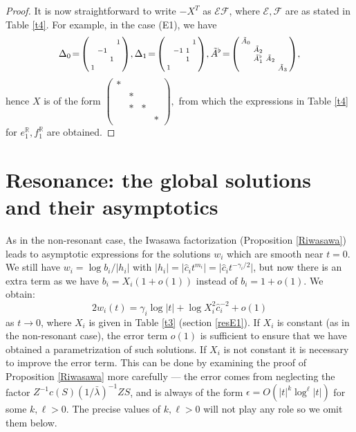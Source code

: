 \documentclass[a4paper,12pt,leqno]{amsart}
\numberwithin{equation}{section}
\theoremstyle{plain}
\theoremstyle{definition}
\newcommand{\R}{\mathbb R}
\newcommand{\ga}{\gamma}
\newcommand{\la}{\lambda}
\newcommand{\eps}{\epsilon}
\newcommand{\De}{\Delta}
\newcommand{\bsp}{\left(\begin{smallmatrix}}
\newcommand{\esp}{\end{smallmatrix}\right)}
\newcommand{\nn}{m}
\begin{document}
{\begin{proof}
It is now straightforward to write $-X^T$ as $\mathcal E \mathcal F$, where $\mathcal E, \mathcal F$ are as stated in Table \ref{t4}.
For example, in the case (E1), we have
\[
\De_0
\!=\!
\bsp
\vphantom{\tilde A_0 }
 & & & 1
\\
\vphantom{\tilde A_0 }
  & -1 &  & 
\\
\vphantom{\tilde A_0 }
   &  \ & 1 & 
\\
\vphantom{\tilde A_0 }
1 & & &
\esp\!,
\De_1
\!=\!
\bsp
\vphantom{\tilde A_0 }
 & & & 1
\\
\vphantom{\tilde A_0 }
  & -1 & 1 & 
\\
\vphantom{\tilde A_0 }
   &  \ & 1 & 
\\
\vphantom{\tilde A_0 }
1 & & &
\esp\!,
\tilde A^\flat
\!=\!
\bsp
\tilde A_0 & & & 
\\
 & \tilde A_2 & & 
\\
 & \tilde A_1^\flat  & \tilde A_2   & 
 \\
 & & & \tilde A_3 
\esp\!,
\]
hence $X$ is of the form
$
\bsp
* & & & 
\\
 & * & & 
\\
 & *  & *   & 
 \\
 & & & *
\esp,
$
from which the expressions in Table \ref{t4} for $e_1^\R,f_1^\R$ are obtained. 
\end{proof}



\section{Resonance: the global solutions and their asymptotics}\label{resGLOBAL}

As in the non-resonant case, the Iwasawa factorization (Proposition \ref{Riwasawa}) leads to asymptotic expressions for the solutions $w_i$ which are smooth near $t=0$. We still have $w_i=\log b_i/\vert h_i\vert$ with 
$\vert h_i\vert =\vert\hat c_i t^{\nn_i}\vert=\vert\hat c_i t^{-\ga_i/2}\vert$, but now there is an extra term as we have
$b_i=X_i(1+o(1))$
instead of
$b_i=1+o(1)$. We obtain:
\begin{equation}\label{asymptotics}
2w_i(t)=\ga_i \log\vert t\vert + \log X_i^2\hat c_i^{-2} + o(1)
\end{equation}
as $t\to 0$, where $X_i$ is given in Table \ref{t3} (section \ref{resE1}).  If $X_i$ is constant (as in the non-resonant case), the error term $o(1)$ is sufficient to ensure that we have obtained a parametrization of such solutions.  If $X_i$ is not constant it is necessary to improve the error term. This can be done by examining the proof of Proposition \ref{Riwasawa} more carefully --- the error comes from neglecting the factor
$Z^{-1} c(S) (1/\bar\la)^{-1} ZS$, and is always of the form
$\eps=O(\vert t\vert^k \log^\ell\vert t\vert)$ for some $k,\ell>0$. The precise values of $k,\ell>0$ will not play any role so we omit them below.

}
\end{document}
